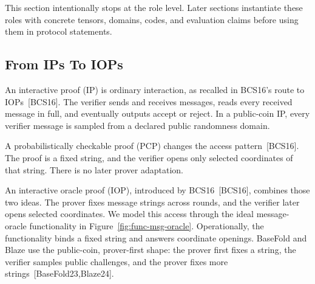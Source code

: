 This section intentionally stops at the role level.  Later sections instantiate
these roles with concrete tensors, domains, codes, and evaluation claims before
using them in protocol statements.

\subsection{From IPs To IOPs}

An interactive proof (IP) is ordinary interaction, as recalled in BCS16's route
to IOPs~[BCS16].  The verifier sends and receives messages, reads every
received message in full, and eventually outputs accept or reject.  In a
public-coin IP, every verifier message is sampled from a declared public
randomness domain.

A probabilistically checkable proof (PCP) changes the access pattern~[BCS16].
The proof is a fixed string, and the verifier opens only selected coordinates of
that string.  There is no later prover adaptation.

An interactive oracle proof (IOP), introduced by BCS16~[BCS16], combines those
two ideas.  The prover fixes message strings across rounds, and the verifier
later opens selected coordinates.  We model this access through the ideal
message-oracle functionality in Figure~\ref{fig:func-msg-oracle}.  Operationally,
the functionality binds a fixed string and answers coordinate openings.  BaseFold
and Blaze use the public-coin, prover-first shape: the prover first fixes a
string, the verifier samples public challenges, and the prover fixes more
strings~[BaseFold23,Blaze24].

